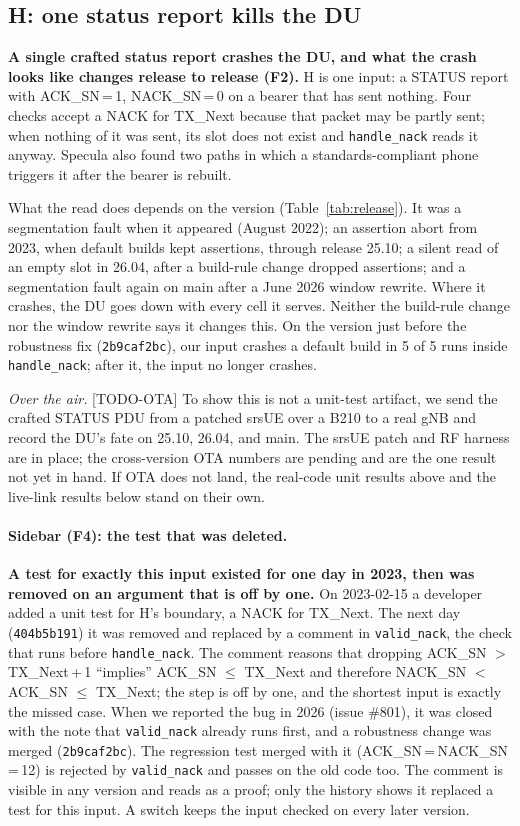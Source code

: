 \documentclass[sigconf,10pt]{acmart}
\newcommand{\sw}[1]{\textsf{\small #1}}
\newcommand{\commit}[1]{\texttt{\small #1}}
\begin{document}
\subsection{\sw{H}: one status report kills the DU}

\textbf{A single crafted status report crashes the DU, and what the crash
looks like changes release to release (F2).}
\sw{H} is one input: a STATUS report with ACK\_SN\,=\,1, NACK\_SN\,=\,0 on
a bearer that has sent nothing. Four checks accept a NACK for TX\_Next
because that packet may be partly sent; when nothing of it was sent, its
slot does not exist and \texttt{handle\_nack} reads it anyway. Specula
also found two paths in which a standards-compliant phone triggers it
after the bearer is rebuilt.

What the read does depends on the version (Table~\ref{tab:release}). It
was a segmentation fault when it appeared (August 2022); an assertion
abort from 2023, when default builds kept assertions, through release
25.10; a silent read of an empty slot in 26.04, after a build-rule change
dropped assertions; and a segmentation fault again on main after a
June 2026 window rewrite. Where it crashes, the DU goes down with every
cell it serves. Neither the build-rule change nor the window rewrite says
it changes this. On the version just before the robustness fix
(\commit{2b9caf2bc}), our input crashes a default build in 5 of 5 runs
inside \texttt{handle\_nack}; after it, the input no longer crashes.

\emph{Over the air.} [TODO-OTA] To show this is not a unit-test artifact,
we send the crafted STATUS PDU from a patched srsUE over a B210 to a real
gNB and record the DU's fate on 25.10, 26.04, and main. The srsUE patch
and RF harness are in place; the cross-version OTA numbers are pending
and are the one result not yet in hand. If OTA does not land, the
real-code unit results above and the live-link results below stand on
their own.

\paragraph{Sidebar (F4): the test that was deleted.}
\textbf{A test for exactly this input existed for one day in 2023, then
was removed on an argument that is off by one.} On 2023-02-15 a developer
added a unit test for \sw{H}'s boundary, a NACK for TX\_Next. The next day
(\commit{404b5b191}) it was removed and replaced by a comment in
\texttt{valid\_nack}, the check that runs before \texttt{handle\_nack}.
The comment reasons that dropping ACK\_SN $>$ TX\_Next\,+\,1 ``implies''
ACK\_SN $\le$ TX\_Next and therefore NACK\_SN $<$ ACK\_SN $\le$ TX\_Next;
the step is off by one, and the shortest input is exactly the missed
case. When we reported the bug in 2026 (issue \#801), it was closed with
the note that \texttt{valid\_nack} already runs first, and a robustness
change was merged (\commit{2b9caf2bc}). The regression test merged with it
(ACK\_SN\,=\,NACK\_SN\,=\,12) is rejected by \texttt{valid\_nack} and
passes on the old code too. The comment is visible in any version and
reads as a proof; only the history shows it replaced a test for this
input. A switch keeps the input checked on every later version.
\end{document}
